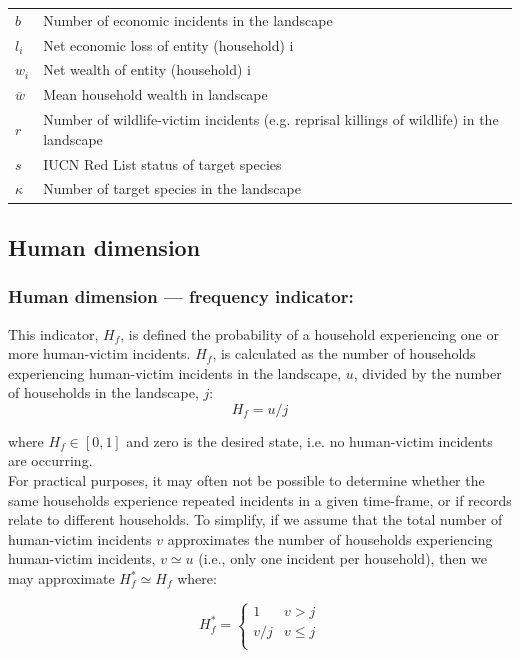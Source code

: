 \documentclass[fleqn,10pt]{olplainarticle}
\begin{document}
\begin{table}[!ht]
\begin{tabular}{p{1cm} p{13cm}}
         $b$ &	Number of economic incidents in the landscape \\
         $l_i$ &	Net economic loss of entity (household) i \\
         $w_i$ &	Net wealth of entity (household) i \\
         $\overline{w}$ & Mean household wealth in landscape \\
         $r$ &	Number of wildlife-victim incidents (e.g. reprisal killings of wildlife) in the landscape \\
         $s$ & IUCN Red List status of target species \\
         $\kappa$ & Number of target species in the landscape
    \end{tabular}
\end{table}


\subsection*{Human dimension}
\subsubsection*{Human dimension --- frequency indicator:}
This indicator, $H_f$, is defined the probability of a household experiencing one or more human-victim incidents. $H_f$, is calculated as the number of households experiencing human-victim incidents in the landscape, $u$, divided by the number of households in the landscape, $j$:
\begin{equation*}
    H_f = u/j
\end{equation*}

where $H_f \in [0,1]$ and zero is the desired state, i.e. no human-victim incidents are occurring.\\

For practical purposes, it may often not be possible to determine whether the same households experience repeated incidents in a given time-frame, or if records relate to different households. To simplify, if we assume that the total number of human-victim incidents $v$ approximates the number of households experiencing human-victim incidents, $v \simeq u$ (i.e., only one incident per household), then we may approximate $H_f^\ast \simeq H_f$ where:

\begin{equation*}
    H_f^\ast = \begin{cases}
        1       & v > j \\
        v/j & v \le j \\
    \end{cases}
\end{equation*}
\end{document}
